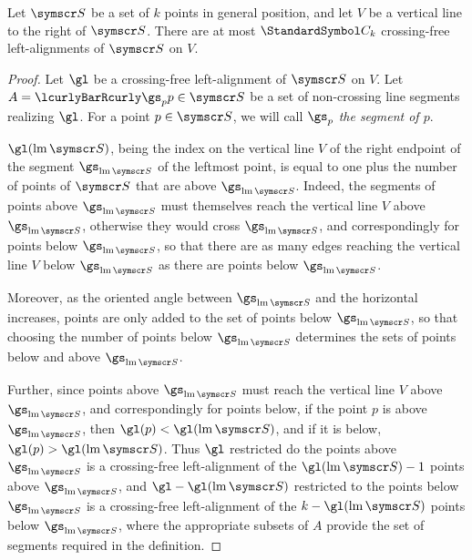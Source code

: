 \begin{lemma}
Let ${\pointset S}$ be a set of $k$ points in general position, and let $V$ be a vertical line to the right of ${\pointset S}$.
There are at most $\CatalanNumber k$ crossing-free left-alignments of ${\pointset S}$ on $V$.
\begin{proof}
Let $\gl$ be a crossing-free left-alignment of ${\pointset S}$ on $V$.
Let $A=\setst{\gs_p}{p\in{\pointset S}}$ be a set of non-crossing line segments realizing $\gl$.
For a point $p\in{\pointset S}$, we will call $\gs_p$ \emph{the segment of $p$}.

$\gl(\leftmost\pointset S)$, being the index on the vertical line $V$ of the right endpoint of the
segment $\gs_{\leftmost\pointset S}$
of the leftmost point,
is equal to one plus the number of points of ${\pointset S}$ that are above $\gs_{\leftmost\pointset S}$.
Indeed, the segments of points above $\gs_{\leftmost\pointset S}$ must
themselves reach the vertical line $V$ above $\gs_{\leftmost\pointset S}$,
otherwise they would cross $\gs_{\leftmost\pointset S}$, and correspondingly for
points below $\gs_{\leftmost\pointset S}$,
so that there are as many edges reaching the vertical line $V$ below $\gs_{\leftmost\pointset S}$ as there are points
below $\gs_{\leftmost\pointset S}$.

Moreover, as the oriented angle between $\gs_{\leftmost\pointset S}$
and the horizontal increases, points are only added to the
set of points below $\gs_{\leftmost\pointset S}$, so that choosing the number of points below
$\gs_{\leftmost\pointset S}$ determines the sets of points
below and above $\gs_{\leftmost\pointset S}$.

Further, since points above $\gs_{\leftmost\pointset S}$ must reach the vertical line $V$ above
$\gs_{\leftmost\pointset S}$, and correspondingly for points below,
if the point $p$ is above $\gs_{\leftmost\pointset S}$, then $\gl(p) < \gl({\leftmost\pointset S})$,
and if it is below, $\gl(p) > \gl({\leftmost\pointset S})$. Thus
$\gl$ restricted do the points above $\gs_{\leftmost\pointset S}$ is a crossing-free left-alignment of
the $\gl({\leftmost\pointset S}) - 1$ points above
$\gs_{\leftmost\pointset S}$, and $\gl-\gl({\leftmost\pointset S})$ restricted to the points below
$\gs_{\leftmost\pointset S}$ is a crossing-free left-alignment of the
$k - \gl({\leftmost\pointset S})$ points below $\gs_{\leftmost\pointset S}$,
where the appropriate subsets of $A$ provide the set of segments required
in the definition.


\end{proof}
\end{lemma}
